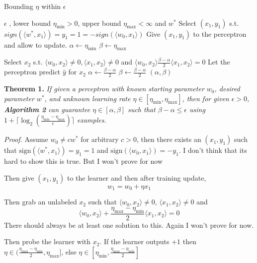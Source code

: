 \documentclass{article}
\begin{document}
\begin{algorithm}
\caption{Bounding $\eta$ within $\epsilon$ }
\begin{algorithmic}[1]
	\REQUIRE $\epsilon$ , lower bound $\eta_{\min} > 0$, upper bound $\eta_{\max} < \infty$ and $w^*$
	\STATE Select $(x_1 , y_1)$ s.t. $sign(\langle w^* , x_1 \rangle) = y_1 = 1 = 
	-sign(\langle w_0 , x_1 \rangle )$
	\STATE Give $(x_1, y_1)$ to the perceptron and allow to update.
	\STATE $\alpha \leftarrow \eta_{\min}$
	\STATE $\beta \leftarrow \eta_{\max}$
	
	\WHILE{$\beta - \alpha > \epsilon$}
		\STATE Select $ x_2$ s.t. $\langle w_0 , x_2 \rangle \neq 0, \langle x_1 , x_2 \rangle \neq 0$ and $\langle w_0, x_2 \rangle \frac{\beta - \alpha}{2}\langle x_1, x_2 \rangle = 0$
		\STATE Let the perceptron predict $\hat{y}$ for $x_2$
			\STATE $ \alpha \leftarrow \frac{\beta - \alpha}{2}$ 		
		\ELSE
			\STATE $ \beta \leftarrow \frac{\beta - \alpha}{2}$ 
		\ENDIF	
	\ENDWHILE   
	\RETURN $(\alpha , \beta)$
\end{algorithmic}
\end{algorithm} 

\textbf{Theorem 1.}
\textit{
If given a perceptron with known starting parameter $w_0$, desired parameter $w^*$, and unknown 
learning rate $\eta \in [\eta_{\min} , \eta_{\max}]$, then for given $\epsilon > 0$, \textbf{Algorithm 2} can guarantee $\eta \in 
[\alpha, \beta]$ such that $\beta - \alpha \leq \epsilon$ using $1 + \lceil \log_2(\frac{\eta_
{\min} - \eta_{\max}}{\epsilon})\rceil$ examples.}

\textit{Proof.}
Assume $w_0 \neq cw^*$ for arbitrary $c > 0$, then there exists an $(x_1, y_1)$ such that $\text{sign}(\langle w^*,x_1 \rangle) = y_1 = 1$ and $\text{sign}(\langle w_0,x_1 \rangle) = -y_1$.
\color{red}
I don't think that its hard to show this is true. But I won't prove for now
\color{black}

Then give $(x_1, y_1)$ to the learner and then after training update,
$$
w_1 = w_0 + \eta x_1
$$

Then grab an unlabeled $x_2$ such that
$\langle w_0,x_2 \rangle \neq 0$, $\langle x_1, x_2 \rangle \neq 0$
and 
$$
\langle w_0,x_2 \rangle + \frac{\eta_{\max} - \eta_{\min}}{2} \langle x_1, x_2 \rangle = 0
$$
\color{red}
There should always be at least one solution to this. Again I won't prove for now.
\color{black}


Then probe the learner with $x_2$. If the learner outputs $+1$ then
$\eta \in (\frac{\eta_{\max} - \eta_{\min}}{2} , \eta_{\max}]$, else 
$\eta \in [\eta_{\min},\frac{\eta_{\max} - \eta_{\min}}{2}]$
\end{document}
